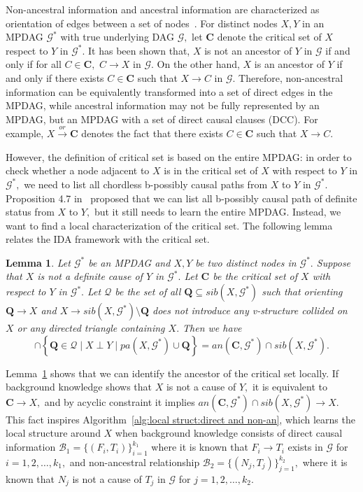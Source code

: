 \documentclass{article}
\newtheorem{lemma}{Lemma}
\begin{document}
Non-ancestral information and ancestral information are characterized as orientation of edges between a set of nodes~\citep{fang2022representation}. For distinct nodes $X,Y$ in an MPDAG $\mathcal{G}^*$ with true underlying DAG $\mathcal{G},$ let $\mathbf{C}$ denote the critical set of $X$ respect to $Y$ in $\mathcal{G}^*.$ It has been shown that, $X$ is not an ancestor of $Y$ in $\mathcal{G}$ if and only if for all $C\in \mathbf{C},$ $C\to X$ in $\mathcal{G}.$ On the other hand, $X$ is an ancestor of $Y$ if and only if there exists $C\in \mathbf{C}$ such that $X\to C$ in $\mathcal{G}.$ Therefore, non-ancestral information can be equivalently transformed into a set of direct edges in the MPDAG, while ancestral information may not be fully represented by an MPDAG, but an MPDAG with a set of direct causal clauses (DCC). For example, $X\overset{or}{\to} \mathbf{C}$ denotes the fact that there exists $C\in \mathbf{C}$ such that $X\to C$.

However, the definition of critical set is based on the entire MPDAG: in order to check whether a node adjacent to $X$ is in the critical set of $X$ with respect to $Y$ in $\mathcal{G}^*,$ we need to list all chordless b-possibly causal paths from $X$ to $Y$ in $\mathcal{G}^*.$ Proposition 4.7 in~\citet{zuo2022counterfactual} proposed that we can list all b-possibly causal path of definite status from $X$ to $Y,$ but it still needs to learn the entire MPDAG. Instead, we want to find a local characterization of the critical set. The following lemma relates the IDA framework with the critical set.

\begin{lemma}
\label{lemma:identify critical set}
Let $\mathcal{G}^*$ be an MPDAG and $X, Y$ be two distinct nodes in $\mathcal{G}^*.$ Suppose that $X$ is not a definite cause of $Y$ in $\mathcal{G}^*.$ Let $\mathbf{C}$ be the critical set of $X$ with respect to $Y$ in $\mathcal{G}^*.$ Let $\mathcal{Q}$ be the set of all $\mathbf{Q}\subseteq sib(X,\mathcal{G}^*)$ such that orienting $\mathbf{Q}\to X$ and $X\to sib(X,\mathcal{G}^*)\setminus \mathbf{Q}$ does not introduce any v-structure collided on $X$ or any directed triangle containing $X.$ Then we have
$$\cap \left\{ \mathbf{Q}\in \mathcal{Q} \mid X\perp Y \mid pa(X,\mathcal{G}^*)\cup \mathbf{Q} \right\} = an(\mathbf{C},\mathcal{G}^*)\cap sib(X,\mathcal{G}^*).$$
\end{lemma}

Lemma~\ref{lemma:identify critical set} shows that we can  identify the ancestor of the critical set locally. If background knowledge shows that $X$ is not a cause of $Y,$ it is equivalent to $\mathbf{C}\to X,$ and by acyclic constraint it implies $an(\mathbf{C},\mathcal{G}^*) \cap sib(X,\mathcal{G}^*)\to X.$ This fact inspires Algorithm~\ref{alg:local struct:direct and non-an}, which learns the local structure around $X$ when background knowledge consists of direct causal information $\mathcal{B}_1=\{(F_i,T_i)\}_{i=1}^{k_1}$ where it is known that $F_i\to T_i$ exists in $\mathcal{G}$ for $i=1,2,\dots,k_1,$ and non-ancestral relationship $\mathcal{B}_2=\{(N_j,T_j)\}_{j=1}^{k_2},$ where it is known that $N_j$ is not a cause of $T_j$ in $\mathcal{G}$ for $j=1,2,\dots,k_2.$
\end{document}
